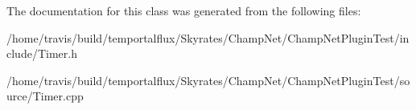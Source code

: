 The documentation for this class was generated from the following files\-:\begin{DoxyCompactItemize}
\item 
/home/travis/build/temportalflux/\-Skyrates/\-Champ\-Net/\-Champ\-Net\-Plugin\-Test/include/Timer.\-h\item 
/home/travis/build/temportalflux/\-Skyrates/\-Champ\-Net/\-Champ\-Net\-Plugin\-Test/source/Timer.\-cpp\end{DoxyCompactItemize}
